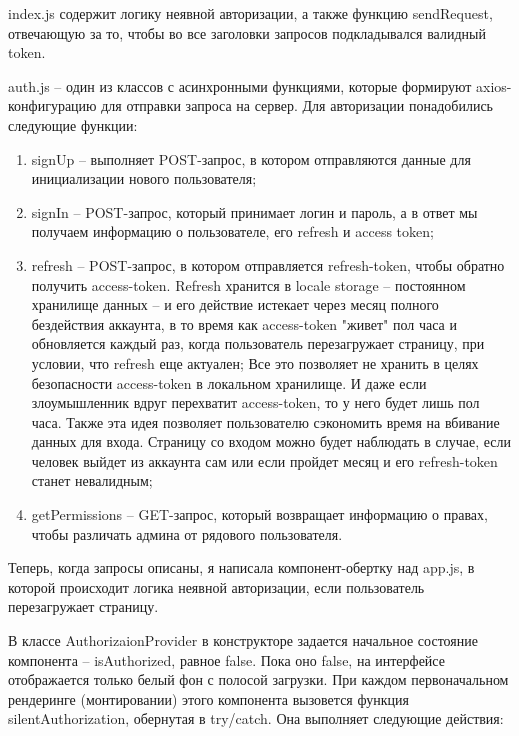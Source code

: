 \documentclass[a4paper,12pt]{diplom}
\begin{document}
index.js содержит логику неявной авторизации, а также функцию sendRequest, отвечающую за то, чтобы во все заголовки запросов подкладывался валидный token.

auth.js -- один из классов с асинхронными функциями, которые формируют axios-конфигурацию для отправки запроса на сервер.
Для авторизации понадобились следующие функции:

\begin{enumerate}
\item signUp -- выполняет POST-запрос, в котором отправляются данные для инициализации нового пользователя;
\item signIn -- POST-запрос, который принимает логин и пароль, а в ответ мы получаем информацию о пользователе, его refresh и access token;
\item refresh -- POST-запрос, в котором отправляется refresh-token, чтобы обратно получить access-token. Refresh хранится в locale storage -- постоянном хранилище данных --
и его действие истекает через месяц полного бездействия аккаунта, в то время как access-token "живет" пол часа и обновляется каждый раз, когда пользователь перезагружает страницу, при условии, что refresh еще актуален;
Все это позволяет не хранить в целях безопасности access-token в локальном хранилище. И даже если злоумышленник вдруг перехватит access-token, то у него будет лишь пол часа. Также эта идея позволяет пользователю сэкономить время на вбивание данных для входа. Страницу со входом можно будет наблюдать в случае, если человек выйдет из аккаунта сам или если пройдет месяц и его refresh-token станет невалидным;
\item getPermissions -- GET-запрос, который возвращает информацию о правах, чтобы различать админа от рядового пользователя.
\end{enumerate}

Теперь, когда запросы описаны, я написала компонент-обертку над app.js, в которой происходит логика неявной авторизации, если пользователь перезагружает страницу.

В классе AuthorizaionProvider в конструкторе задается начальное состояние компонента -- isAuthorized, равное false. Пока оно false, на интерфейсе отображается только белый фон с полосой загрузки. При каждом первоначальном рендеринге (монтировании) этого компонента
вызовется функция silentAuthorization, обернутая в try/catch. Она выполняет следующие действия:
\end{document}

